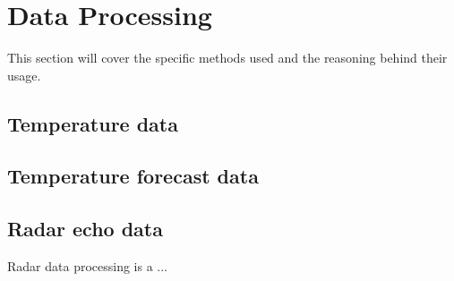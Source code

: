 \section{Data Processing}
This section will cover the specific methods used and the reasoning behind their usage.






\subsection{Temperature data}

\subsection{Temperature forecast data}


\subsection{Radar echo data}
Radar data processing is a ...

